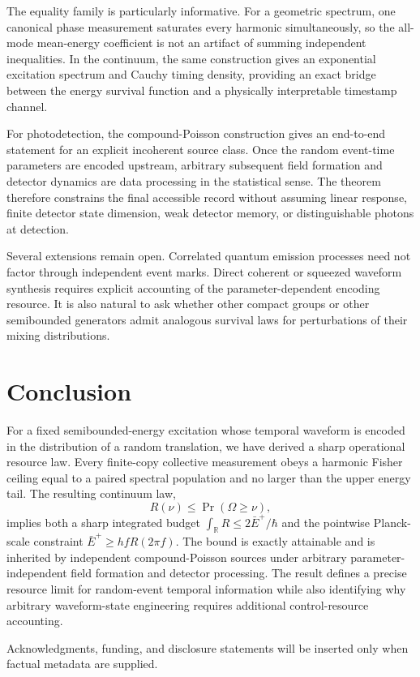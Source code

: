 \documentclass[aps,pra,reprint,amsmath,amssymb,longbibliography]{revtex4-2}
\begin{document}
The equality family is particularly informative.  For a geometric spectrum, one canonical phase measurement saturates every harmonic simultaneously, so the all-mode mean-energy coefficient is not an artifact of summing independent inequalities.  In the continuum, the same construction gives an exponential excitation spectrum and Cauchy timing density, providing an exact bridge between the energy survival function and a physically interpretable timestamp channel.

For photodetection, the compound-Poisson construction gives an end-to-end statement for an explicit incoherent source class.  Once the random event-time parameters are encoded upstream, arbitrary subsequent field formation and detector dynamics are data processing in the statistical sense.  The theorem therefore constrains the final accessible record without assuming linear response, finite detector state dimension, weak detector memory, or distinguishable photons at detection.

Several extensions remain open.  Correlated quantum emission processes need not factor through independent event marks.  Direct coherent or squeezed waveform synthesis requires explicit accounting of the parameter-dependent encoding resource.  It is also natural to ask whether other compact groups or other semibounded generators admit analogous survival laws for perturbations of their mixing distributions.

\section{Conclusion}

For a fixed semibounded-energy excitation whose temporal waveform is encoded in the distribution of a random translation, we have derived a sharp operational resource law.  Every finite-copy collective measurement obeys a harmonic Fisher ceiling equal to a paired spectral population and no larger than the upper energy tail.  The resulting continuum law,
\begin{equation}
 R(\nu)\leq\Pr(\Omega\geq\nu),
\end{equation}
implies both a sharp integrated budget $\int_{\mathbb R}R\leq2\bar E^+/\hbar$ and the pointwise Planck-scale constraint $\bar E^+\geq hfR(2\pi f)$.  The bound is exactly attainable and is inherited by independent compound-Poisson sources under arbitrary parameter-independent field formation and detector processing.  The result defines a precise resource limit for random-event temporal information while also identifying why arbitrary waveform-state engineering requires additional control-resource accounting.

\begin{acknowledgments}
Acknowledgments, funding, and disclosure statements will be inserted only when factual metadata are supplied.
\end{acknowledgments}


\end{document}
